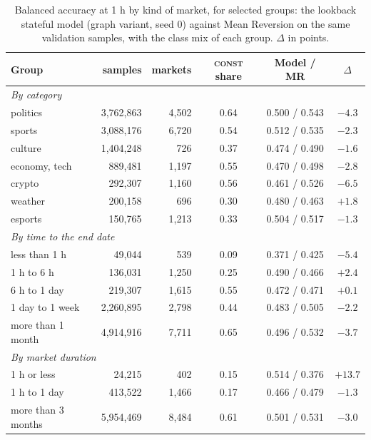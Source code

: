 \begin{table}[t]
\centering
\caption{Balanced accuracy at 1 h by kind of market, for selected groups: the lookback
stateful model (graph variant, seed 0) against Mean Reversion on the same validation
samples, with the class mix of each group.  $\Delta$ in points.}
\label{tab:horizons:where}
\small
\begin{fittable}\begin{tabular}{lrrccc}
\toprule
Group & samples & markets & \textsc{const} share & Model / MR & $\Delta$ \\
\midrule
\multicolumn{6}{l}{\emph{By category}} \\
politics          & 3{,}762{,}863 & 4{,}502 & 0.64 & 0.500 / 0.543 & $-4.3$ \\
sports            & 3{,}088{,}176 & 6{,}720 & 0.54 & 0.512 / 0.535 & $-2.3$ \\
culture           & 1{,}404{,}248 &   726   & 0.37 & 0.474 / 0.490 & $-1.6$ \\
economy, tech     &   889{,}481   & 1{,}197 & 0.55 & 0.470 / 0.498 & $-2.8$ \\
crypto            &   292{,}307   & 1{,}160 & 0.56 & 0.461 / 0.526 & $-6.5$ \\
weather           &   200{,}158   &   696   & 0.30 & 0.480 / 0.463 & $+1.8$ \\
esports           &   150{,}765   & 1{,}213 & 0.33 & 0.504 / 0.517 & $-1.3$ \\
\midrule
\multicolumn{6}{l}{\emph{By time to the end date}} \\
less than 1 h     &    49{,}044   &   539   & 0.09 & 0.371 / 0.425 & $-5.4$ \\
1 h to 6 h        &   136{,}031   & 1{,}250 & 0.25 & 0.490 / 0.466 & $+2.4$ \\
6 h to 1 day      &   219{,}307   & 1{,}615 & 0.55 & 0.472 / 0.471 & $+0.1$ \\
1 day to 1 week   & 2{,}260{,}895 & 2{,}798 & 0.44 & 0.483 / 0.505 & $-2.2$ \\
more than 1 month & 4{,}914{,}916 & 7{,}711 & 0.65 & 0.496 / 0.532 & $-3.7$ \\
\midrule
\multicolumn{6}{l}{\emph{By market duration}} \\
1 h or less       &    24{,}215   &   402   & 0.15 & 0.514 / 0.376 & $+13.7$ \\
1 h to 1 day      &   413{,}522   & 1{,}466 & 0.17 & 0.466 / 0.479 & $-1.3$ \\
more than 3 months & 5{,}954{,}469 & 8{,}484 & 0.61 & 0.501 / 0.531 & $-3.0$ \\

\end{tabular}
\end{fittable}
\end{table}
